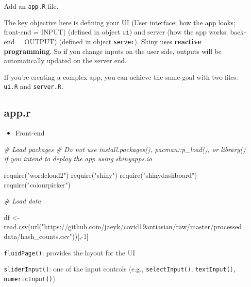 \documentclass[
]{book}
\newenvironment{Shaded}{\begin{snugshade}}{\end{snugshade}}
\newcommand{\CommentTok}[1]{\textcolor[rgb]{0.56,0.35,0.01}{\textit{#1}}}
\newcommand{\DecValTok}[1]{\textcolor[rgb]{0.00,0.00,0.81}{#1}}
\newcommand{\FunctionTok}[1]{\textcolor[rgb]{0.00,0.00,0.00}{#1}}
\newcommand{\NormalTok}[1]{#1}
\newcommand{\OtherTok}[1]{\textcolor[rgb]{0.56,0.35,0.01}{#1}}
\newcommand{\SpecialCharTok}[1]{\textcolor[rgb]{0.00,0.00,0.00}{#1}}
\newcommand{\StringTok}[1]{\textcolor[rgb]{0.31,0.60,0.02}{#1}}
\providecommand{\tightlist}{%
  \setlength{\itemsep}{0pt}\setlength{\parskip}{0pt}}
\begin{document}
Add an \texttt{app.R} file.

The key objective here is defining your UI (User interface; how the app looks; front-end = INPUT) (defined in object \texttt{ui}) and server (how the app works; back-end = OUTPUT) (defined in object \texttt{server}). Shiny uses \textbf{reactive programming}. So if you change inputs on the user side, outputs will be automatically updated on the server end.

If you're creating a complex app, you can achieve the same goal with two files: \texttt{ui.R} and \texttt{server.R.}

\hypertarget{app.r}{%
\subsection{app.r}\label{app.r}}

\begin{itemize}
\tightlist
\item
  Front-end
\end{itemize}

\begin{Shaded}
\begin{Highlighting}[]
\CommentTok{\# Load packages }
\CommentTok{\# Do not use install.packages(), pacman::p\_load(), or library() if you intend to deploy the app using shinyapps.io }

\FunctionTok{require}\NormalTok{(}\StringTok{"wordcloud2"}\NormalTok{)}
\FunctionTok{require}\NormalTok{(}\StringTok{"shiny"}\NormalTok{)}
\FunctionTok{require}\NormalTok{(}\StringTok{"shinydashboard"}\NormalTok{)}
\FunctionTok{require}\NormalTok{(}\StringTok{"colourpicker"}\NormalTok{)}
\end{Highlighting}
\end{Shaded}

\begin{Shaded}
\begin{Highlighting}[]
\CommentTok{\# Load data }

\NormalTok{df }\OtherTok{\textless{}{-}} \FunctionTok{read.csv}\NormalTok{(}\FunctionTok{url}\NormalTok{(}\StringTok{"https://github.com/jaeyk/covid19antiasian/raw/master/processed\_data/hash\_counts.csv"}\NormalTok{))[,}\SpecialCharTok{{-}}\DecValTok{1}\NormalTok{]}
\end{Highlighting}
\end{Shaded}

\texttt{fluidPage()}: provides the layout for the UI

\texttt{sliderInput()}: one of the input controls (e.g., \texttt{selectInput()}, \texttt{textInput()}, \texttt{numericInput()})
\end{document}
